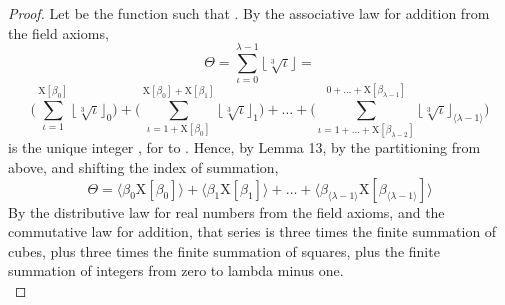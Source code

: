 \documentclass[preview]{standalone}
\begin{document}
\begin{proof}
    Let  be the function 
    such that .
    By the associative law for addition from the field axioms,
    \begin{equation*}
        \Theta
            =
        \sum_{\iota=0}^{\lambda - 1}
                \big \lfloor \sqrt[3] \iota \big \rfloor
            =
    \end{equation*}
    \begin{equation*}
        \Bigg(
            \sum_{ \iota = 1 }^{ \mathrm{X} [\beta_0] }
                \big \lfloor \sqrt[3] \iota \big \rfloor_0
        \Bigg)
            +
        \Bigg(
            \sum_{
                \iota = 1 + \mathrm{X}[\beta_0]
            }^{ 
                \mathrm{X}[\beta_0] + \mathrm{X}[\beta_1]
            }
                \big \lfloor \sqrt[3] \iota \big \rfloor_1
        \Bigg)
            +
        \dots
            +
        \Bigg(
            \sum_{
                \iota = 1 + \dots 
                    + 
                \mathrm{X}[\beta_{\lambda - 2}]
            }^{ 
                0 + \dots
                    +
                \mathrm{X}[\beta_{ \lambda - 1 }]
            }
                \big \lfloor \sqrt[3] \iota \big \rfloor_{ \langle \lambda - 1 \rangle }
        \Bigg)
    \end{equation*}
    \bm{$\big \lfloor \sqrt[3] \iota \big \rfloor_\tau$}
    is the unique integer \bm{$\beta_\tau$},
    for  to 
    \bm{$\big \langle \lambda - 1 \big \rangle$}.
    Hence, by Lemma 13,
    by the partitioning from above, 
    and shifting the index of summation,
    \begin{equation*}
        \Theta
            =
        \Big \langle \beta_0 \mathrm{X} [\beta_0] \Big \rangle
            +
        \Big \langle \beta_1 \mathrm{X} [\beta_1] \Big \rangle
            + 
        \dots 
            +
        \Big \langle 
            \beta_{\langle \lambda - 1 \rangle}
            \mathrm{X} [\beta_{\langle \lambda - 1 \rangle}]
        \Big \rangle
    \end{equation*}
    By the distributive law for real numbers from the field axioms,
    and the commutative law for addition, that series is
    three times the finite summation of cubes,
    plus three times the finite summation of squares,
    plus the finite summation of integers from zero to lambda minus one.
    \begin{equation*}

\end{equation*}
\end{proof}
\end{document}
